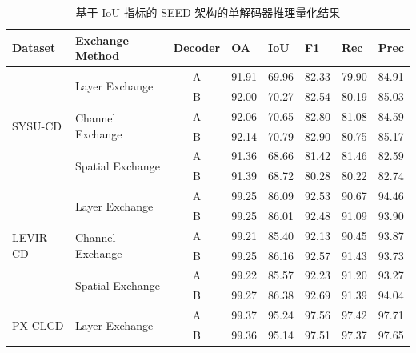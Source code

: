 \begin{table}[!htbp]
    \centering
    \scriptsize %
    \caption{基于 IoU 指标的 SEED 架构的单解码器推理量化结果}
    \label{tab:inference_single_decoder}
    \begin{tabularx}{\textwidth}{l X c X X X X X}
        \hline
        \textbf{Dataset} & \textbf{Exchange Method} & \textbf{Decoder} & \textbf{OA} & \textbf{IoU} & \textbf{F1} & \textbf{Rec} & \textbf{Prec} \\
        \hline
        \multirow{6}{*}{SYSU-CD}
            & \multirow{2}{*}{Layer Exchange}   & A & 91.91 & 69.96 & 82.33 & 79.90 & 84.91 \\
            &                                   & B & 92.00 & 70.27 & 82.54 & 80.19 & 85.03 \\
            \cline{2-8}
            & \multirow{2}{*}{Channel Exchange} & A & 92.06 & 70.65 & 82.80 & 81.08 & 84.59 \\
            &                                   & B & 92.14 & 70.79 & 82.90 & 80.75 & 85.17 \\
            \cline{2-8}
            & \multirow{2}{*}{Spatial Exchange} & A & 91.36 & 68.66 & 81.42 & 81.46 & 82.59 \\
            &                                   & B & 91.39 & 68.72 & 80.28 & 80.22 & 82.74 \\
        \hline
        \multirow{6}{*}{LEVIR-CD}
            & \multirow{2}{*}{Layer Exchange}   & A & 99.25 & 86.09 & 92.53 & 90.67 & 94.46 \\
            &                                   & B & 99.25 & 86.01 & 92.48 & 91.09 & 93.90 \\
            \cline{2-8}
            & \multirow{2}{*}{Channel Exchange} & A & 99.21 & 85.40 & 92.13 & 90.45 & 93.87 \\
            &                                   & B & 99.25 & 86.16 & 92.57 & 91.43 & 93.73 \\
            \cline{2-8}
            & \multirow{2}{*}{Spatial Exchange} & A & 99.22 & 85.57 & 92.23 & 91.20 & 93.27 \\
            &                                   & B & 99.27 & 86.38 & 92.69 & 91.39 & 94.04 \\
        \hline
        \multirow{6}{*}{PX-CLCD}
            & \multirow{2}{*}{Layer Exchange}   & A & 99.37 & 95.24 & 97.56 & 97.42 & 97.71 \\
            &                                   & B & 99.36 & 95.14 & 97.51 & 97.37 & 97.65 \\

\end{tabularx}
\end{table}
